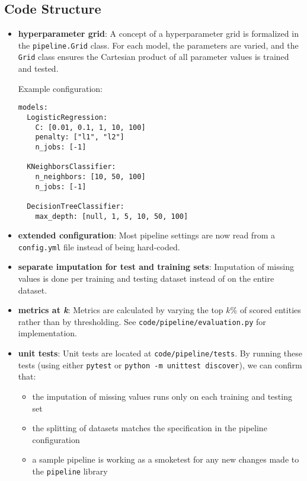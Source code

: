 \documentclass[11pt]{article}
\begin{document}
\subsection{Code Structure}
\begin{itemize}
\item \textbf{hyperparameter grid}: A concept of a hyperparameter grid is formalized in the \texttt{pipeline.Grid} class. For each model, the parameters are varied, and the \texttt{Grid} class ensures the Cartesian product of all parameter values is trained and tested.

Example configuration: 
\begin{lstlisting}[numbers=none]
models:
  LogisticRegression:
    C: [0.01, 0.1, 1, 10, 100]
    penalty: ["l1", "l2"]
    n_jobs: [-1]

  KNeighborsClassifier:
    n_neighbors: [10, 50, 100]
    n_jobs: [-1]

  DecisionTreeClassifier:
    max_depth: [null, 1, 5, 10, 50, 100]
\end{lstlisting}

\item \textbf{extended configuration}: Most pipeline settings are now read from a \texttt{config.yml} file instead of being hard-coded.
\item \textbf{separate imputation for test and training sets}: Imputation of missing values is done per  training and testing dataset instead of on the entire dataset. 
\item \textbf{metrics at \textit{k}}: Metrics are calculated by varying the top $k$\% of scored entities rather than by thresholding. See \texttt{code/pipeline/evaluation.py} for implementation.
\item \textbf{unit tests}: Unit tests are located at \texttt{code/pipeline/tests}. By running these tests (using either \texttt{pytest} or \texttt{python -m unittest discover}), we can confirm that: 
\begin{itemize}
\item the imputation of missing values runs only on each training and testing set 
\item the splitting of datasets matches the specification in the pipeline configuration
\item a sample pipeline is working as a smoketest for any new changes made to the \texttt{pipeline} library
\end{itemize} 
\end{itemize}
\end{document}
